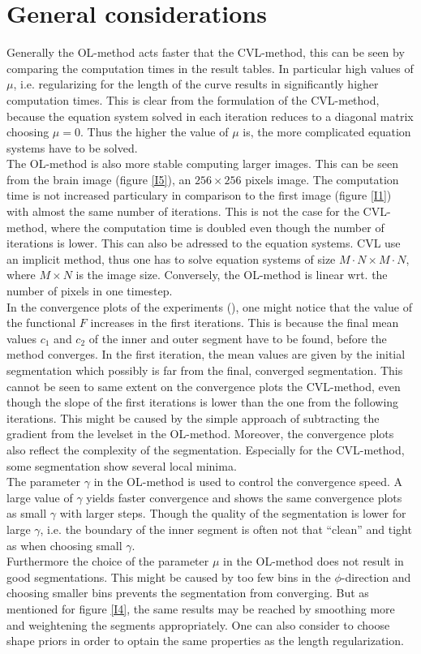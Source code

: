 \section{General considerations}
Generally the OL-method acts faster that the CVL-method, this can be seen by comparing the computation times in the result tables. In particular high values of $\mu$, i.e. regularizing for the length of the curve results in significantly higher computation times. This is clear from the formulation of the CVL-method, because the equation system solved in each iteration reduces to a diagonal matrix choosing $\mu=0$. Thus the higher the value of $\mu$ is, the more complicated equation systems have to be solved.\\
The OL-method is also more stable computing larger images. This can be seen from the brain image (figure \ref{I5}), an $256\times 256$ pixels image. The computation time is not increased particulary in comparison to the first image (figure \ref{I1}) with almost the same number of iterations. This is not the case for the CVL-method, where the computation time is doubled even though the number of iterations is lower. This can also be adressed to the equation systems. CVL use an implicit method, thus one has to solve equation systems of size $M\cdot N\times M\cdot N$, where $M\times N$ is the image size. Conversely, the OL-method is linear wrt. the number of pixels in one timestep.\\
In the convergence plots of the experiments (), one might notice that the value of the functional $F$ increases in the first iterations. This is because the final mean values $c_1$ and $c_2$ of the inner and outer segment have to be found, before the method converges. In the first iteration, the mean values are given by the initial segmentation which possibly is far from the final, converged segmentation. This cannot be seen to same extent on the convergence plots the CVL-method, even though the slope of the first iterations is lower than the one from the following iterations. This might be caused by the simple approach of subtracting the gradient from the levelset in the OL-method. Moreover, the convergence plots also reflect the complexity of the segmentation. Especially for the CVL-method, some segmentation show several local minima.\\
The parameter $\gamma$ in the OL-method is used to control the convergence speed. A large value of $\gamma$ yields faster convergence and shows the same convergence plots as small $\gamma$ with larger steps. Though the quality of the segmentation is lower for large $\gamma$, i.e. the boundary of the inner segment is often not that ``clean'' and tight as when choosing small $\gamma$.\\ 
Furthermore the choice of the parameter $\mu$ in the OL-method does not result in good segmentations. This might be caused by too few bins in the $\phi$-direction and choosing smaller bins prevents the segmentation from converging. But as mentioned for figure \ref{I4}, the same results may be reached by smoothing more and weightening the segments appropriately. One can also consider to choose shape priors in order to optain the same properties as the length regularization.


